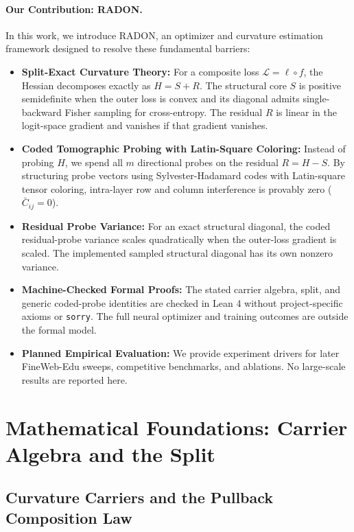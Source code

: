 \documentclass[11pt,a4paper]{article}
\theoremstyle{definition}
\theoremstyle{remark}
\begin{document}
\paragraph{Our Contribution: RADON.}
In this work, we introduce RADON, an optimizer and curvature estimation framework designed to resolve these fundamental barriers:
\begin{itemize}
    \item \textbf{Split-Exact Curvature Theory:} For a composite loss $\mathcal{L} = \ell \circ f$, the Hessian decomposes exactly as $H = S + R$. The structural core $S$ is positive semidefinite when the outer loss is convex and its diagonal admits single-backward Fisher sampling for cross-entropy. The residual $R$ is linear in the logit-space gradient and vanishes if that gradient vanishes.
    \item \textbf{Coded Tomographic Probing with Latin-Square Coloring:} Instead of probing $H$, we spend all $m$ directional probes on the residual $R = H - S$. By structuring probe vectors using Sylvester-Hadamard codes with Latin-square tensor coloring, intra-layer row and column interference is provably zero ($\bar{C}_{ij} = 0$).
    \item \textbf{Residual Probe Variance:} For an exact structural diagonal, the coded residual-probe variance scales quadratically when the outer-loss gradient is scaled. The implemented sampled structural diagonal has its own nonzero variance.
    \item \textbf{Machine-Checked Formal Proofs:} The stated carrier algebra, split, and generic coded-probe identities are checked in Lean 4 without project-specific axioms or \texttt{sorry}. The full neural optimizer and training outcomes are outside the formal model.
    \item \textbf{Planned Empirical Evaluation:} We provide experiment drivers for later FineWeb-Edu sweeps, competitive benchmarks, and ablations. No large-scale results are reported here.
\end{itemize}

\section{Mathematical Foundations: Carrier Algebra and the Split}

\subsection{Curvature Carriers and the Pullback Composition Law}
\end{document}
